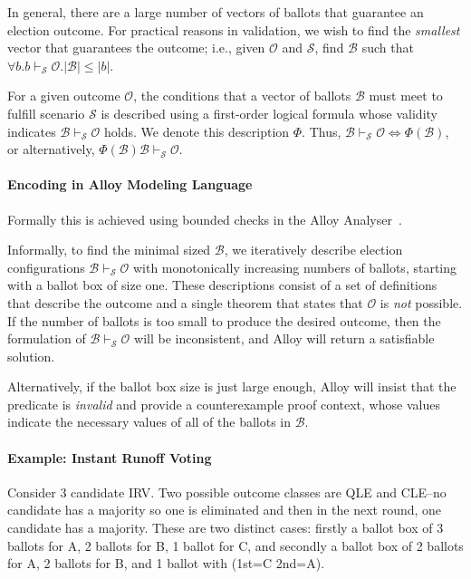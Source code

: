 \documentclass[runningheads,a4paper]{llncs}
\newcommand{\ie}{i.e.,\xspace}
\newcommand{\outcome}{\ensuremath{\mathcal{O}}\xspace}
\newcommand{\scenario}{\ensuremath{\mathcal{S}}\xspace}
\newcommand{\ballots}{\ensuremath{\mathcal{B}}\xspace}
\newcommand{\ballotspec}{\ensuremath{\Phi}\xspace}
\newcommand{\config}{\ensuremath{\ballots \vdash_\scenario \outcome}\xspace}
\begin{document}
In general, there are a large number of vectors of ballots that
guarantee an election outcome.  For practical reasons in validation,
we wish to find the \emph{smallest} vector that guarantees the
outcome; \ie given \outcome and \scenario, find \ballots such that
$\forall b . b \vdash_\scenario \outcome . |\ballots| \leq |b|$.

For a given outcome \outcome, the conditions that a vector of ballots
\ballots must meet to fulfill scenario \scenario is described using a
first-order logical formula whose validity indicates \config holds.
We denote this description \ballotspec.  Thus, $\config
\Leftrightarrow \ballotspec(\ballots)$, or alternatively,
$\ballotspec(\ballots) \config$.

\paragraph{Encoding in Alloy Modeling Language}

Formally this is achieved using bounded checks in the Alloy
Analyser~\cite{jackson2012software}.

Informally, to find the minimal sized \ballots, we iteratively
describe election configurations \config with monotonically increasing
numbers of ballots, starting with a ballot box of size one.  These
descriptions consist of a set of definitions that describe the outcome and
a single theorem that states that \outcome is \emph{not} possible.
If the number of ballots is too small to produce the desired outcome,
then the formulation of \config will be inconsistent, and Alloy
will return a satisfiable solution.

Alternatively, if the ballot box size is just large enough, Alloy
will insist that the predicate is \emph{invalid} and provide a
counterexample proof context, whose values indicate the necessary
values of all of the ballots in \ballots.

\paragraph{Example: Instant Runoff Voting}

Consider 3 candidate IRV. Two possible outcome classes are QLE and
CLE--no candidate has a majority so one is eliminated and then in the
next round, one candidate has a majority. These are two distinct
cases: firstly a ballot box of
3 ballots for A,
2 ballots for B,
1 ballot for C,
and secondly a ballot box of
2 ballots for A,
2 ballots for B, and
1 ballot with (1st=C 2nd=A).
\end{document}
